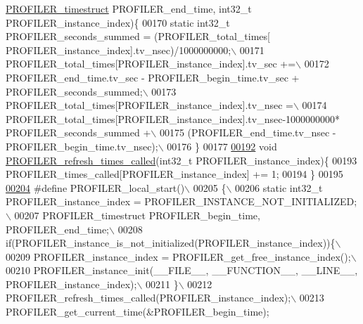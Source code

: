 \begin{DoxyCode}
      \hyperlink{group___xD0_x9F_xD0_xBE_xD1_x80_xD1_x82_xD0_xB8_xD1_x80_xD1_x83_xD0_xB5_xD0_xBC_xD0_xB0_xD1_x8F_2ef1b31e26d7139e4bfe94879d1322e3_gae02193769f3b21a09fc0d5035e566a75}{PROFILER_timestruct} PROFILER\_end\_time, int32\_t PROFILER\_instance\_index)\{
00170     \textcolor{keyword}{static} int32\_t PROFILER\_seconds\_summed = (PROFILER\_total\_times[
      PROFILER\_instance\_index].tv\_nsec)/1000000000;\(\backslash\)
00171     PROFILER\_total\_times[PROFILER\_instance\_index].tv\_sec +=\(\backslash\)
00172         PROFILER\_end\_time.tv\_sec - PROFILER\_begin\_time.tv\_sec + 
      PROFILER\_seconds\_summed;\(\backslash\)
00173     PROFILER\_total\_times[PROFILER\_instance\_index].tv\_nsec =\(\backslash\)
00174         PROFILER\_total\_times[PROFILER\_instance\_index].tv\_nsec-1000000000*
      PROFILER\_seconds\_summed +\(\backslash\)
00175         (PROFILER\_end\_time.tv\_nsec - PROFILER\_begin\_time.tv\_nsec);\(\backslash\)
00176 \}
00177 
\hypertarget{_p_r_o_f_i_l_i_n_g__tools_8h_source_l00192}{}\hyperlink{_p_r_o_f_i_l_i_n_g__tools_8h_a2629430c71701c51e4c8897a61cd0edb}{00192} \textcolor{keywordtype}{void} \hyperlink{_p_r_o_f_i_l_i_n_g__tools_8h_a2629430c71701c51e4c8897a61cd0edb}{PROFILER_refresh_times_called}(int32\_t PROFILER\_instance\_index)\{
00193     PROFILER\_times\_called[PROFILER\_instance\_index] += 1;
00194 \}
00195 
\hypertarget{_p_r_o_f_i_l_i_n_g__tools_8h_source_l00204}{}\hyperlink{_p_r_o_f_i_l_i_n_g__tools_8h_a632f3afa2c72dd938e2a5d7e9c1e202e}{00204} \textcolor{preprocessor}{#define PROFILER\_local\_start()\(\backslash\)}
00205 \textcolor{preprocessor}{        \{\(\backslash\)}
00206 \textcolor{preprocessor}{                static int32\_t PROFILER\_instance\_index =
       PROFILER\_INSTANCE\_NOT\_INITIALIZED;\(\backslash\)}
00207 \textcolor{preprocessor}{                PROFILER\_timestruct PROFILER\_begin\_time, PROFILER\_end\_time;\(\backslash\)}
00208 \textcolor{preprocessor}{                
      if(PROFILER\_instance\_is\_not\_initialized(PROFILER\_instance\_index))\{\(\backslash\)}
00209 \textcolor{preprocessor}{            PROFILER\_instance\_index = PROFILER\_get\_free\_instance\_index();\(\backslash\)}
00210 \textcolor{preprocessor}{            PROFILER\_instance\_init(\_\_FILE\_\_, \_\_FUNCTION\_\_, \_\_LINE\_\_,
       PROFILER\_instance\_index);\(\backslash\)}
00211 \textcolor{preprocessor}{                \}\(\backslash\)}
00212 \textcolor{preprocessor}{        PROFILER\_refresh\_times\_called(PROFILER\_instance\_index);\(\backslash\)}
00213 \textcolor{preprocessor}{        PROFILER\_get\_current\_time(&PROFILER\_begin\_time);}

\end{DoxyCode}
